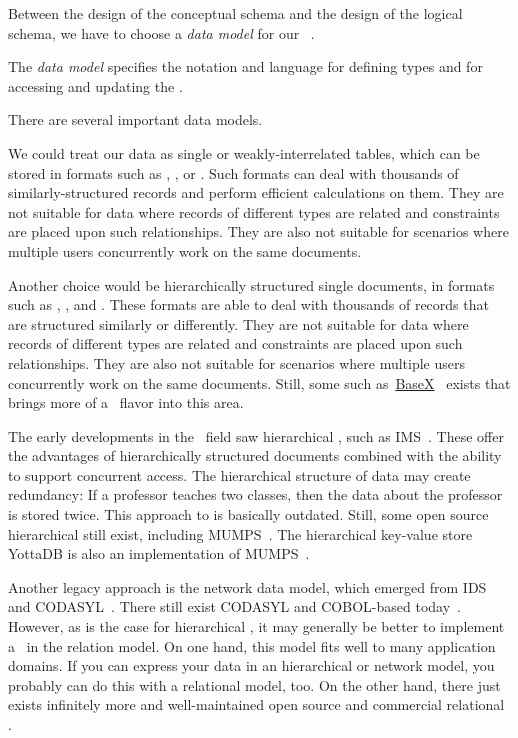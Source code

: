 %
\label{sec:dbModelSelection}%
%
Between the design of the conceptual schema and the design of the logical schema, we have to choose a \emph{data model} for our \db~\cite{SS2005EIDDDFDB:I}.%
%
\begin{definition}%
The \emph{data model} specifies the notation and language for defining types and for accessing and updating the \db.%
\end{definition}%
%
There are several important data models.

We could treat our data as single or weakly-interrelated tables, which can be stored in formats such as , , or .
Such formats can deal with thousands of similarly-structured records and perform efficient calculations on them.
They are not suitable for data where records of different types are related and constraints are placed upon such relationships.
They are also not suitable for scenarios where multiple users concurrently work on the same documents.

Another choice would be hierarchically structured single documents, in formats such as , , and .
These formats are able to deal with thousands of records that are structured similarly or differently.
They are not suitable for data where records of different types are related and constraints are placed upon such relationships.
They are also not suitable for scenarios where multiple users concurrently work on the same documents.
Still, some  such as~\href{https://basex.org}{BaseX}~\cite{GHS2010B,G2006PXMMDTTL} exists that brings more of a \db\ flavor into this area.

The early developments in the \db\ field saw hierarchical , such as IMS~\cite{KLBGNLWBS2012ITIYCGTIIMS,BBP2007TBOI,KC2024DS:ITD}.
These offer the advantages of hierarchically structured documents combined with the ability to support concurrent access.
The hierarchical structure of data may create redundancy:
If a professor teaches two classes, then the data about the professor is stored twice.
This approach to  is basically outdated.
Still, some open source hierarchical  still exist, including MUMPS~\cite{O2008TMPL,O2025TMPL}.
The hierarchical key-value store YottaDB is also an implementation of MUMPS~\cite{B2018THALOMMATFOY}.

Another legacy approach is the network data model, which emerged from IDS~\cite{B2009TOOTIDSITFDAD,B1965SFRAP,H2016HCBITDAFOODW} and CODASYL~\cite{TF1976CDBMS}.
There still exist CODASYL and COBOL-based  today~\cite{O2022OCDDARM}.
However, as is the case for hierarchical , it may generally be better to implement a \db\ in the relation model.
On one hand, this model fits well to many application domains.
If you can express your data in an hierarchical or network model, you probably can do this with a relational model, too.
On the other hand, there just exists infinitely more and well-maintained open source and commercial relational .

